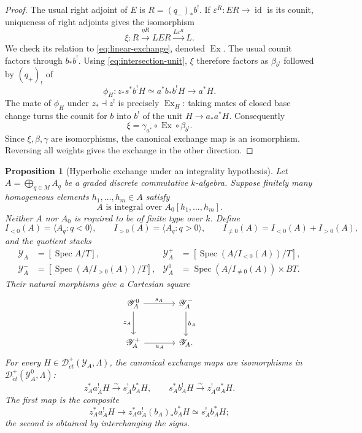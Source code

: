 \documentclass[11pt,a4paper]{article}
\newcommand{\Spec}{\operatorname{Spec}}
\newcommand{\Det}{\mathcal D_{\acute et}}
\newcommand{\cY}{\mathscr Y}
\theoremstyle{notes}
\newtheorem{bprop}[blem]{Proposition}
\begin{document}
\begin{proof}
The usual right adjoint of $E$ is $R=(q_-)_*b^!$. If $\varepsilon^R:ER\to\operatorname{id}$ is its counit, uniqueness of right adjoints gives the isomorphism
\[
\xi:R\xrightarrow{\eta R}LER\xrightarrow{L\varepsilon^R}L.
\]
We check its relation to \eqref{eq:linear-exchange}, denoted $\operatorname{Ex}$. The usual counit factors through $b_*b^!$. Using \eqref{eq:intersection-unit}, $\xi$ therefore factors as $\beta_{b^!}$ followed by $(q_+)_!$ of
\[
\phi_H:z_*s^*b^!H\simeq a^*b_*b^!H
\longrightarrow a^*H.
\]
The mate of $\phi_H$ under $z_*\dashv z^!$ is precisely $\operatorname{Ex}_H$: taking mates of closed base change turns the counit for $b$ into $b^!$ of the unit $H\to a_*a^*H$. Consequently
\[
\xi=\gamma_{a^*}\circ\operatorname{Ex}\circ\beta_{b^!}.
\]
Since $\xi,\beta,\gamma$ are isomorphisms, the canonical exchange map is an isomorphism. Reversing all weights gives the exchange in the other direction.
\end{proof}

\begin{bprop}[Hyperbolic exchange under an integrality hypothesis]\label{prop:exchange}
Let $A=\bigoplus_{q\in M}A_q$ be a graded discrete commutative $k$-algebra. Suppose finitely many homogeneous elements $h_1,\ldots,h_m\in A$ satisfy
\begin{equation}\label{eq:integrality}
A\text{ is integral over }A_0[h_1,\ldots,h_m].
\end{equation}
Neither $A$ nor $A_0$ is required to be of finite type over $k$. Define
\[
I_{<0}(A)=\langle A_q:q<0\rangle,\qquad
I_{>0}(A)=\langle A_q:q>0\rangle,\qquad
I_{\ne0}(A)=I_{<0}(A)+I_{>0}(A),
\]
and the quotient stacks
\[
\begin{aligned}
\cY_A&=[\Spec A/T],&
\cY_A^+&=[\Spec(A/I_{<0}(A))/T],\\
\cY_A^-&=[\Spec(A/I_{>0}(A))/T],&
\cY_A^0&=\Spec(A/I_{\ne0}(A))\times BT.
\end{aligned}
\]
Their natural morphisms give a Cartesian square
\begin{equation}\label{eq:graded-square}
\begin{tikzcd}[column sep=large,row sep=large]
\cY_A^0\ar[r,"s_A"]\ar[d,"z_A"']&\cY_A^-\ar[d,"b_A"]\\
\cY_A^+\ar[r,"a_A"']&\cY_A.
\end{tikzcd}
\end{equation}
For every $H\in\Det^+(\cY_A,\Lambda)$, the canonical exchange maps are isomorphisms in $\Det^+(\cY_A^0,\Lambda)$:
\begin{equation}\label{eq:graded-exchange}
z_A^*a_A^!H\xrightarrow{\sim}s_A^!b_A^*H,
\qquad s_A^*b_A^!H\xrightarrow{\sim}z_A^!a_A^*H.
\end{equation}
The first map is the composite
\[
z_A^*a_A^!H\longrightarrow z_A^*a_A^!(b_A)_*b_A^*H
\simeq s_A^!b_A^*H;
\]
the second is obtained by interchanging the signs.
\end{bprop}
\end{document}
